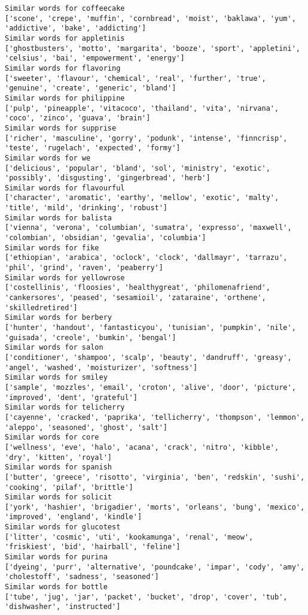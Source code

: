\documentclass[11pt]{article}
\begin{document}
\begin{Verbatim}[commandchars=\\\{\}]
Similar words for coffeecake
['scone', 'crepe', 'muffin', 'cornbread', 'moist', 'baklawa', 'yum', 'addictive', 'bake', 'addicting']
Similar words for appletinis
['ghostbusters', 'motto', 'margarita', 'booze', 'sport', 'appletini', 'celsius', 'bai', 'empowerment', 'energy']
Similar words for flavoring
['sweeter', 'flavour', 'chemical', 'real', 'further', 'true', 'genuine', 'create', 'generic', 'bland']
Similar words for philippine
['pulp', 'pineapple', 'vitacoco', 'thailand', 'vita', 'nirvana', 'coco', 'zinco', 'guava', 'brain']
Similar words for supprise
['richer', 'masculine', 'gorry', 'podunk', 'intense', 'finncrisp', 'teste', 'rugelach', 'expected', 'formy']
Similar words for we
['delicious', 'popular', 'bland', 'sol', 'ministry', 'exotic', 'possibly', 'disgusting', 'gingerbread', 'herb']
Similar words for flavourful
['character', 'aromatic', 'earthy', 'mellow', 'exotic', 'malty', 'title', 'mild', 'drinking', 'robust']
Similar words for balista
['vienna', 'verona', 'columbian', 'sumatra', 'expresso', 'maxwell', 'colombian', 'obsidian', 'gevalia', 'columbia']
Similar words for fike
['ethiopian', 'arabica', 'oclock', 'clock', 'dallmayr', 'tarrazu', 'phil', 'grind', 'raven', 'peaberry']
Similar words for yellowrose
['costellinis', 'floosies', 'healthygreat', 'philomenafriend', 'cankersores', 'peased', 'sesamioil', 'zataraine', 'orthene', 'skilledretired']
Similar words for berbery
['hunter', 'handout', 'fantasticyou', 'tunisian', 'pumpkin', 'nile', 'guisada', 'creole', 'bumkin', 'bengal']
Similar words for salon
['conditioner', 'shampoo', 'scalp', 'beauty', 'dandruff', 'greasy', 'angel', 'washed', 'moisturizer', 'softness']
Similar words for smiley
['sample', 'mozzles', 'email', 'croton', 'alive', 'door', 'picture', 'improved', 'dent', 'grateful']
Similar words for telicherry
['cayenne', 'cracked', 'paprika', 'tellicherry', 'thompson', 'lemmon', 'aleppo', 'seasoned', 'ghost', 'salt']
Similar words for core
['wellness', 'eve', 'halo', 'acana', 'crack', 'nitro', 'kibble', 'dry', 'kitten', 'royal']
Similar words for spanish
['butter', 'greece', 'risotto', 'virginia', 'ben', 'redskin', 'sushi', 'cooking', 'pilaf', 'brittle']
Similar words for solicit
['york', 'hashier', 'brigadier', 'morts', 'orleans', 'bung', 'mexico', 'improved', 'england', 'kindle']
Similar words for glucotest
['litter', 'cosmic', 'uti', 'kookamunga', 'renal', 'meow', 'friskiest', 'bid', 'hairball', 'feline']
Similar words for purina
['dyeing', 'purr', 'alternative', 'poundcake', 'impar', 'cody', 'amy', 'cholestoff', 'sadness', 'seasoned']
Similar words for bottle
['tube', 'jug', 'jar', 'packet', 'bucket', 'drop', 'cover', 'tub', 'dishwasher', 'instructed']

\end{Verbatim}
\end{document}
